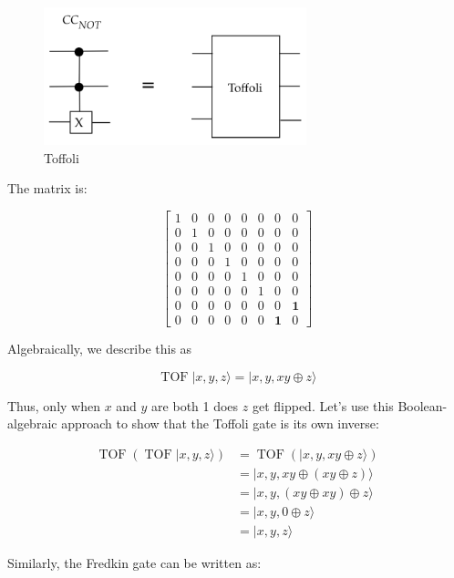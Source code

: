 \documentclass[main.tex]{subfiles}
\begin{document}
    \begin{figure}
        \centering
        \includegraphics[width=3in]{notes/figs/n10/08toffoli.png}
        \caption{Toffoli}
        \label{fig:08toffoli}
    \end{figure}
    
    The matrix is:
    
    $$
    \left[\begin{array}{llllllll}
    1 & 0 & 0 & 0 & 0 & 0 & 0 & 0 \\
    0 & 1 & 0 & 0 & 0 & 0 & 0 & 0 \\
    0 & 0 & 1 & 0 & 0 & 0 & 0 & 0 \\
    0 & 0 & 0 & 1 & 0 & 0 & 0 & 0 \\
    0 & 0 & 0 & 0 & 1 & 0 & 0 & 0 \\
    0 & 0 & 0 & 0 & 0 & 1 & 0 & 0 \\
    0 & 0 & 0 & 0 & 0 & 0 & 0 & \mathbf{1} \\
    0 & 0 & 0 & 0 & 0 & 0 & \mathbf{1} & 0
    \end{array}\right]
    $$
    
    Algebraically, we describe this as
    
    $$
    \operatorname{TOF}|x, y, z\rangle=|x, y, x y \oplus z\rangle
    $$
    
    Thus, only when $x$ and $y$ are both 1 does $z$ get flipped. Let's use this Boolean-algebraic approach to show that the Toffoli gate is its own inverse:
    
    $$
    \begin{aligned}
    \operatorname{TOF}(\operatorname{TOF}|x, y, z\rangle) &=\operatorname{TOF}(|x, y, x y \oplus z\rangle) \\
    &=|x, y, x y \oplus(x y \oplus z)\rangle \\
    &=|x, y,(x y \oplus x y) \oplus z\rangle \\
    &=|x, y, 0 \oplus z\rangle \\
    &=|x, y, z\rangle
    \end{aligned}
    $$
    
    Similarly, the Fredkin gate can be written as:
    
\end{document}
